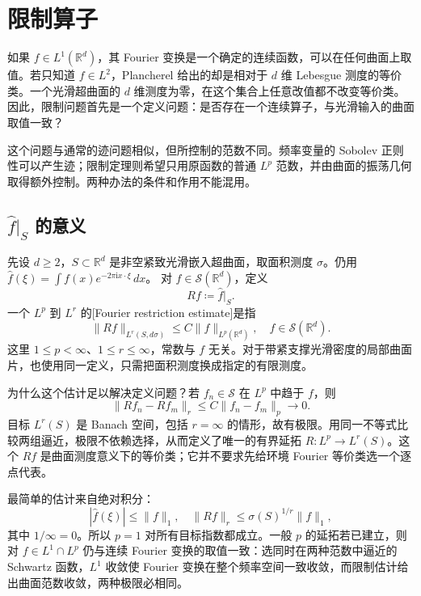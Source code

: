 \section{限制算子}
\label{b2:sec:2301}

如果 \(f\in L^1(\mathbb R^d)\)，其 Fourier 变换是一个确定的连续函数，可以在任何曲面上取值。若只知道 \(f\in L^2\)，Plancherel 给出的却是相对于 \(d\) 维 Lebesgue 测度的等价类。一个光滑超曲面的 \(d\) 维测度为零，在这个集合上任意改值都不改变等价类。因此，限制问题首先是一个定义问题：是否存在一个连续算子，与光滑输入的曲面取值一致？

\ProseParagraphBreak
这个问题与通常的迹问题相似，但所控制的范数不同。频率变量的 Sobolev 正则性可以产生迹；限制定理则希望只用原函数的普通 \(L^p\) 范数，并由曲面的振荡几何取得额外控制。两种办法的条件和作用不能混用。

\subsection{\texorpdfstring{\(\widehat f|_S\)}{Fourier 变换在 S 上的限制} 的意义}
\label{b2:subsec:230101}

先设 \(d\geq2\)，\(S\subset\mathbb R^d\) 是非空紧致光滑嵌入超曲面，取面积测度 \(\sigma\)。仍用
\(\widehat f(\xi)=\int f(x)e^{-2\pi\mathrm i x\cdot\xi}\,dx\)。
对 \(f\in\mathcal S(\mathbb R^d)\)，定义
\[
 Rf\coloneqq\widehat f|_S.
\]
一个 \(L^p\) 到 \(L^r\) 的[Fourier restriction estimate]是指
\[
 \|Rf\|_{L^r(S,d\sigma)}\leq C\|f\|_{L^p(\mathbb R^d)},
 \quad f\in\mathcal S(\mathbb R^d).
\]
这里 \(1\leq p<\infty\)、\(1\leq r\leq\infty\)，常数与 \(f\) 无关。对于带紧支撑光滑密度的局部曲面片，也使用同一定义，只需把面积测度换成指定的有限测度。

\ProseParagraphBreak
为什么这个估计足以解决定义问题？若 \(f_n\in\mathcal S\) 在 \(L^p\) 中趋于 \(f\)，则
\[
 \|Rf_n-Rf_m\|_r\leq C\|f_n-f_m\|_p\longrightarrow0.
\]
目标 \(L^r(S)\) 是 Banach 空间，包括 \(r=\infty\) 的情形，故有极限。用同一不等式比较两组逼近，极限不依赖选择，从而定义了唯一的有界延拓 \(R:L^p\to L^r(S)\)。这个 \(Rf\) 是曲面测度意义下的等价类；它并不要求先给环境 Fourier 等价类选一个逐点代表。

\ProseParagraphBreak
最简单的估计来自绝对积分：
\[
 |\widehat f(\xi)|\leq\|f\|_1,\quad
 \|Rf\|_r\leq\sigma(S)^{1/r}\|f\|_1,
\]
其中 \(1/\infty=0\)。所以 \(p=1\) 对所有目标指数都成立。一般 \(p\) 的延拓若已建立，则对 \(f\in L^1\cap L^p\) 仍与连续 Fourier 变换的取值一致：选同时在两种范数中逼近的 Schwartz 函数，\(L^1\) 收敛使 Fourier 变换在整个频率空间一致收敛，而限制估计给出曲面范数收敛，两种极限必相同。

